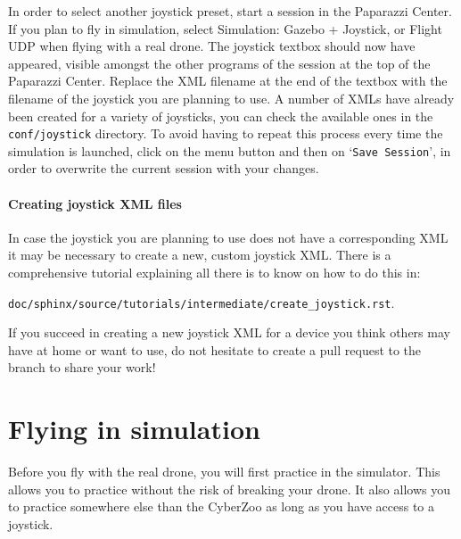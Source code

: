 In order to select another joystick preset, start a session in the Paparazzi Center. If you plan to fly in simulation, select Simulation: Gazebo + Joystick, or Flight UDP when flying with a real drone. The joystick textbox should now have appeared, visible amongst the other programs of the session at the top of the Paparazzi Center. Replace the XML filename at the end of the textbox with the filename of the joystick you are planning to use. A number of XMLs have already been created for a variety of joysticks, you can check the available ones in the \texttt{conf/joystick} directory. To avoid having to repeat this process every time the simulation is launched, click on the menu button  and then on `\texttt{Save Session}', in order to overwrite the current session with your changes.

\paragraph{Creating joystick XML files}

In case the joystick you are planning to use does not have a corresponding XML it may be necessary to create a new, custom joystick XML. There is a comprehensive tutorial explaining all there is to know on how to do this in: 

\texttt{doc/sphinx/source/tutorials/intermediate/create\_joystick.rst}.

If you succeed in creating a new joystick XML for a device you think others may have at home or want to use, do not hesitate to create a pull request to the \coursebranch{} branch to share your work!

\section{Flying in simulation}
Before you fly with the real drone, you will first practice in the simulator.
This allows you to practice without the risk of breaking your drone. It also allows you to practice somewhere else than the CyberZoo as long as you have access to a joystick.

\medskip

